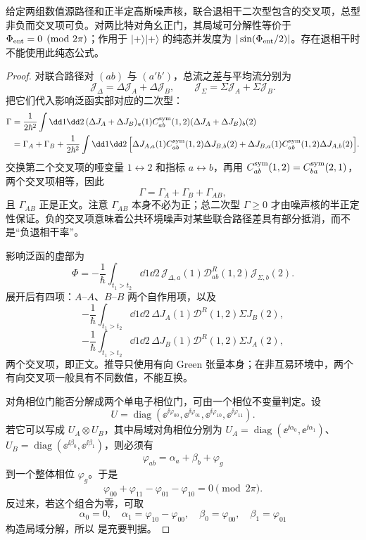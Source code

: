 \begin{proposition}[公共高斯噪声与对角相位门]
给定两组数值源路径和正半定高斯噪声核，联合退相干二次型包含的交叉项，总型非负而交叉项可负。对两比特对角幺正门，其局域可分解性等价于 $\Phi_{\rm ent}=0\pmod{2\pi}$；作用于 $|+\rangle|+\rangle$ 的纯态并发度为 $|\sin(\Phi_{\rm ent}/2)|$。存在退相干时不能使用此纯态公式。
\end{proposition}
\begin{proof}
对联合路径对 $(ab)$ 与 $(a'b')$，总流之差与平均流分别为
\[
\mathcal J_\Delta
=\Delta\mathcal J_A+\Delta\mathcal J_B,
\qquad
\mathcal J_\Sigma
=\Sigma\mathcal J_A+\Sigma\mathcal J_B.
\]
把它们代入影响泛函实部对应的二次型：
\begin{align*}
\Gamma
&=\frac1{2\hbar^2}\int\dd1\dd2\,
(\Delta J_A+\Delta J_B)_a(1)
C_{ab}^{\rm sym}(1,2)
(\Delta J_A+\Delta J_B)_b(2)\\
&=\Gamma_A+\Gamma_B
+\frac1{2\hbar^2}\int\dd1\dd2\,
\Big[
\Delta J_{A,a}(1)C_{ab}^{\rm sym}(1,2)\Delta J_{B,b}(2)
+\Delta J_{B,a}(1)C_{ab}^{\rm sym}(1,2)\Delta J_{A,b}(2)
\Big].
\end{align*}
交换第二个交叉项的哑变量 $1\leftrightarrow2$ 和指标 $a\leftrightarrow b$，再用
$C_{ab}^{\rm sym}(1,2)=C_{ba}^{\rm sym}(2,1)$，两个交叉项相等，因此
\[
\Gamma=\Gamma_A+\Gamma_B+\Gamma_{AB},
\]
且 $\Gamma_{AB}$ 正是正文。注意 $\Gamma_{AB}$ 本身不必为正；总二次型 $\Gamma\ge0$ 才由噪声核的半正定性保证。负的交叉项意味着公共环境噪声对某些联合路径差具有部分抵消，而不是“负退相干率”。

影响泛函的虚部为
\[
\Phi
=-\frac1\hbar
\int_{t_1>t_2}\dd1\dd2\,
\mathcal J_{\Delta,a}(1)
\mathcal D^R_{ab}(1,2)
\mathcal J_{\Sigma,b}(2).
\]
展开后有四项：$A$--$A$、$B$--$B$ 两个自作用项，以及
\[
-\frac1\hbar\int_{t_1>t_2}\dd1\dd2\,
\Delta J_A(1)\mathcal D^R(1,2)\Sigma J_B(2),
\]
\[
-\frac1\hbar\int_{t_1>t_2}\dd1\dd2\,
\Delta J_B(1)\mathcal D^R(1,2)\Sigma J_A(2),
\]
两个交叉项，即正文。推导只使用有向 Green 张量本身；在非互易环境中，两个有向交叉项一般具有不同数值，不能互换。

对角相位门能否分解成两个单电子相位门，可由一个相位不变量判定。设
\[
U=\operatorname{diag}
(\ee^{\ii\varphi_{00}},\ee^{\ii\varphi_{01}},
 \ee^{\ii\varphi_{10}},\ee^{\ii\varphi_{11}}).
\]
若它可以写成
$U_A\otimes U_B$，其中局域对角相位分别为
$U_A=\operatorname{diag}(\ee^{\ii\alpha_0},\ee^{\ii\alpha_1})$、
$U_B=\operatorname{diag}(\ee^{\ii\beta_0},\ee^{\ii\beta_1})$，则必须有
\[
\varphi_{ab}=\alpha_a+\beta_b+\varphi_g
\]
到一个整体相位 $\varphi_g$。于是
\[
\varphi_{00}+\varphi_{11}-\varphi_{01}-\varphi_{10}=0\pmod{2\pi}.
\]
反过来，若这个组合为零，可取
\[
\alpha_0=0,\quad
\alpha_1=\varphi_{10}-\varphi_{00},\quad
\beta_0=\varphi_{00},\quad
\beta_1=\varphi_{01}
\]
构造局域分解，所以 是充要判据。


\end{proof}
